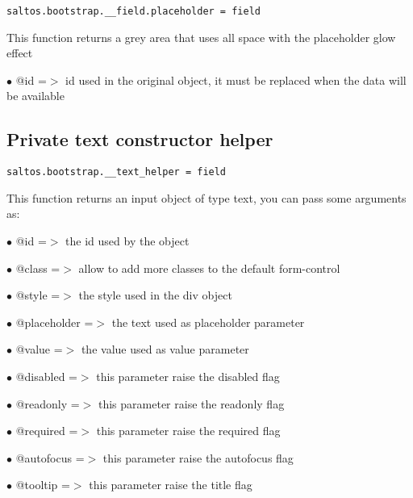 \documentclass[a4paper]{book}
\begin{document}
\begin{lstlisting}
saltos.bootstrap.__field.placeholder = field
\end{lstlisting}

This function returns a grey area that uses all space with the placeholder glow effect

\begin{compactitem}
\item[\color{myblue}$\bullet$] @id =$>$ id used in the original object, it must be replaced when the data will be available
\end{compactitem}

\hypertarget{toc466}{}
\subsection{Private text constructor helper}

\begin{lstlisting}
saltos.bootstrap.__text_helper = field
\end{lstlisting}

This function returns an input object of type text, you can pass some arguments as:

\begin{compactitem}
\item[\color{myblue}$\bullet$] @id          =$>$ the id used by the object
\item[\color{myblue}$\bullet$] @class       =$>$ allow to add more classes to the default form-control
\item[\color{myblue}$\bullet$] @style       =$>$ the style used in the div object
\item[\color{myblue}$\bullet$] @placeholder =$>$ the text used as placeholder parameter
\item[\color{myblue}$\bullet$] @value       =$>$ the value used as value parameter
\item[\color{myblue}$\bullet$] @disabled    =$>$ this parameter raise the disabled flag
\item[\color{myblue}$\bullet$] @readonly    =$>$ this parameter raise the readonly flag
\item[\color{myblue}$\bullet$] @required    =$>$ this parameter raise the required flag
\item[\color{myblue}$\bullet$] @autofocus   =$>$ this parameter raise the autofocus flag
\item[\color{myblue}$\bullet$] @tooltip     =$>$ this parameter raise the title flag
\end{compactitem}
\end{document}
